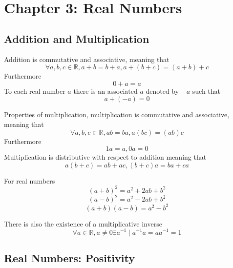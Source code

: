 \section{Chapter 3: Real Numbers}
\subsection{Addition and Multiplication}
\begin{addition}
Addition is commutative and associative, meaning that
\[
\forall a, b, c \in \mathbb{R}, a + b = b + a, a + (b + c) = (a + b) + c
\]
Furthermore
\[
0 + a = a
\]
To each real number $a$ there is an associated $a$ denoted by $-a$ such that
\[
a + (-a) = 0
\]
\end{addition}
\begin{multiplication}
Properties of multiplication, multiplication is commutative and associative, meaning that
\[
\forall a, b, c \in \mathbb{R}, ab = ba, a(bc) = (ab)c
\]
Furthermore
\[
1a = a, 0a = 0
\]
Multiplication is distributive with respect to addition meaning that
\[
a(b + c) = ab + ac, (b + c)a = ba + ca
\]
\end{multiplication}
\begin{corollary}
For real numbers
\[
(a + b)^2 = a^2 + 2ab + b^2
\]
\[
(a - b)^2 = a^2 - 2ab + b^2
\]
\[
(a + b)(a - b) = a^2 - b^2
\]
\end{corollary}
\begin{corollary}
There is also the existence of a multiplicative inverse
\[
\forall a \in \mathbb{R}, a \neq 0 \exists a^{-1} \mid a^{-1}a = aa^{-1} = 1
\]
\end{corollary}
\subsection{Real Numbers: Positivity}
\theoremstyle{plain}
\newtheorem{positivity}{Positivity}[section]
